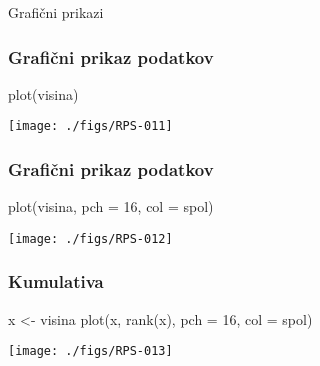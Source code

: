 Grafični prikazi
\begin{frame}[fragile]
\frametitle{Grafični prikaz podatkov}
 { {\vspace{-1cm}}}
\begin{Schunk}
\begin{Sinput}
  plot(visina)
\end{Sinput}
\end{Schunk}
\texttt{[image: ./figs/RPS-011]}
\end{frame}
\begin{frame}[fragile]
\frametitle{Grafični prikaz podatkov}
 {\vspace{-1cm}}
\begin{Schunk}
\begin{Sinput}
  plot(visina, pch = 16, col = spol)
\end{Sinput}
\end{Schunk}
\texttt{[image: ./figs/RPS-012]}
\end{frame}
\begin{frame}[fragile]
\frametitle{Kumulativa}
 {\vspace{-1cm}}
\begin{Schunk}
\begin{Sinput}
  x <- visina
  plot(x, rank(x), pch = 16, col = spol)
\end{Sinput}
\end{Schunk}
\texttt{[image: ./figs/RPS-013]}
\end{frame}


